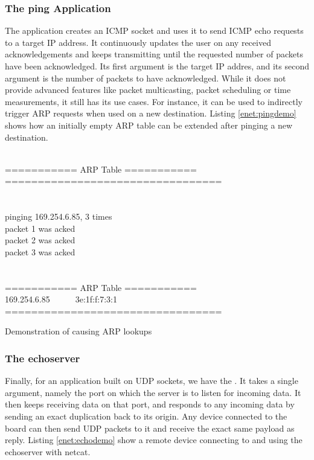 \subsubsection{The ping Application}
The application  creates an ICMP socket and uses it to send ICMP echo requests to a target IP address. It continuously updates the user on any received acknowledgements and keeps transmitting until the requested number of packets have been acknowledged. Its first argument is the target IP addres, and its second argument is the number of packets to have acknowledged. While it does not provide advanced features like packet multicasting, packet scheduling or time measurements, it still has its use cases. For instance, it can be used to indirectly trigger ARP requests when used on a new destination. Listing \ref{enet:pingdemo} shows how an initially empty ARP table can be extended after pinging a new destination.

\begin{code}
\begin{mdframed}[style=shell]
\\
=========== ARP Table ===========\\
=================================\\
\\
\\
pinging 169.254.6.85, 3 times\\
packet 1 was acked\\
packet 2 was acked\\
packet 3 was acked\\
\\
\\
=========== ARP Table ===========\\
169.254.6.85\ \ \ \ \ \ 3e:1f:f:7:3:1\\
=================================
\end{mdframed}
\caption{Demonstration of  causing ARP lookups}
\end{code}
\label{enet:pingdemo}

\subsubsection{The echoserver}
Finally, for an application built on UDP sockets, we have the . It takes a single argument, namely the port on which the server is to listen for incoming data. It then keeps receiving data on that port, and responds to any incoming data by sending an exact duplication back to its origin. Any device connected to the board can then send UDP packets to it and receive the exact same payload as reply. Listing \ref{enet:echodemo} show a remote device connecting to and using the echoserver with netcat.

